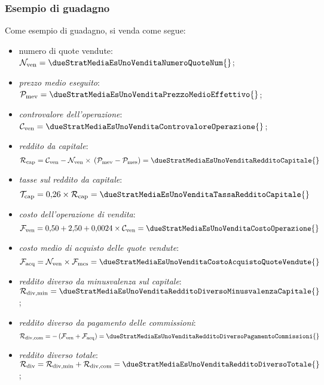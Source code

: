 \documentclass[12pt,a4paper]{article}
\newcommand{\CalcoloCostoOperazioneSim}[1]{\num{0,50} + \num{2,50} + \num{0,0024} \times{} #1}
\newcommand{\CalcoloTasseSim}[1]{\num{0,26} \times{} #1}
\newcommand{\Nven}[1]{\mathcal{N}_{\textrm{ven}#1}}
\newcommand{\Pme}[1]{\mathcal{P}_{\mathrm{me}#1}}
\newcommand{\Pmev}[1]{\mathcal{P}_{\mathrm{mev}#1}}
\newcommand{\Pmes}[1]{\Pme{\mathrm{s}#1}}
\newcommand{\Cven}[1]{\mathcal{C}_{\mathrm{ven}#1}}
\newcommand{\Rcap}[1]{\mathcal{R}_{\mathrm{cap}#1}}
\newcommand{\Rdiv}[1]{\mathcal{R}_{\mathrm{div}#1}}
\newcommand{\Rdivmin}[1]{\mathcal{R}_{\mathrm{div,min}#1}}
\newcommand{\Rdivcom}[1]{\mathcal{R}_{\mathrm{div,com}#1}}
\newcommand{\Tredcap}[1]{\mathcal{T}_{\mathrm{cap}#1}}
\newcommand{\Facq}[1]{\mathcal{F}_{\mathrm{acq}#1}}
\newcommand{\Fven}[1]{\mathcal{F}_{\mathrm{ven}#1}}
\newcommand{\Fmcs}[1]{\mathcal{F}_{\mathrm{mcs}#1}}
\begin{document}

\subsubsection{Esempio di guadagno}


Come esempio di guadagno, si venda come segue:
\begin{itemize}
\item numero di quote vendute:
  \(\Nven{} = \dueStratMediaEsUnoVenditaNumeroQuoteNum{}\);
\item \emph{prezzo medio eseguito}:
  \(\Pmev{} = \dueStratMediaEsUnoVenditaPrezzoMedioEffettivo{}\);
\item \emph{controvalore dell'operazione}:
  \(\Cven{} = \dueStratMediaEsUnoVenditaControvaloreOperazione{}\);

\item \emph{reddito da capitale}:
  \begin{equation*}
    \Rcap{}
    = \Cven{} - \Nven{} \times{} \left( \Pmev{} - \Pmes{} \right)
    = \dueStratMediaEsUnoVenditaRedditoCapitale{}
  \end{equation*}
\item \emph{tasse sul reddito da capitale}:
  \begin{equation*}
    \Tredcap{} = \CalcoloTasseSim{\Rcap{}} = \dueStratMediaEsUnoVenditaTassaRedditoCapitale{}
  \end{equation*}

\item \emph{costo dell'operazione di vendita}:
  \begin{equation*}
    \Fven{} = \CalcoloCostoOperazioneSim{\Cven{}} = \dueStratMediaEsUnoVenditaCostoOperazione{}
  \end{equation*}
\item \emph{costo medio di acquisto delle quote vendute}:
  \begin{equation*}
    \Facq{} = \Nven{} \times{} \Fmcs{} = \dueStratMediaEsUnoVenditaCostoAcquistoQuoteVendute{}
  \end{equation*}
\item \emph{reddito diverso da minusvalenza sul capitale}:
  \(\Rdivmin{} = \dueStratMediaEsUnoVenditaRedditoDiversoMinusvalenzaCapitale{}\);
\item \emph{reddito diverso da pagamento delle commissioni}:
  \begin{equation*}
    \Rdivcom{}
    = - \left( \Fven{} + \Facq{} \right)
    = \dueStratMediaEsUnoVenditaRedditoDiversoPagamentoCommissioni{}
  \end{equation*}
\item \emph{reddito diverso totale}:
  \(\Rdiv{} = \Rdivmin{} + \Rdivcom{} = \dueStratMediaEsUnoVenditaRedditoDiversoTotale{}\);


\end{itemize}
\end{document}

